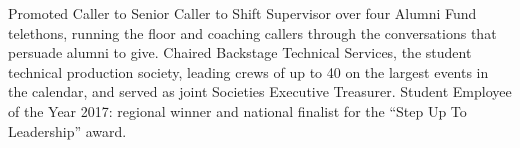 Promoted Caller to Senior Caller to Shift Supervisor over four Alumni Fund telethons, running the floor and coaching callers through the conversations that persuade alumni to give. Chaired Backstage Technical Services, the student technical production society, leading crews of up to 40 on the largest events in the calendar, and served as joint Societies Executive Treasurer. Student Employee of the Year 2017: regional winner and national finalist for the ``Step Up To Leadership'' award.
\sectionsep{}

